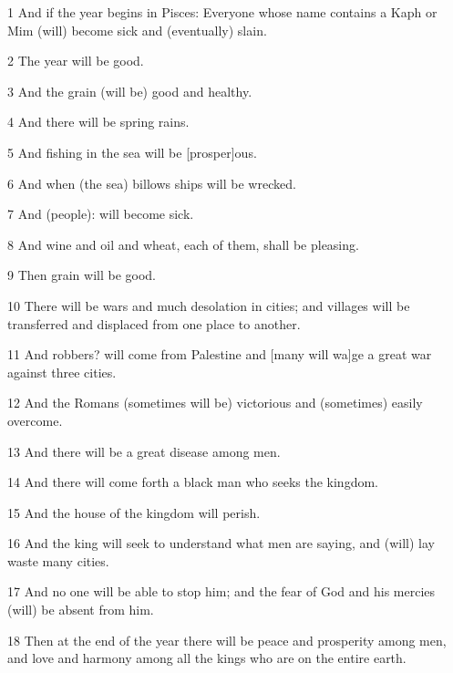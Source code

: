 \par 1 And if the year begins in Pisces: Everyone whose name contains a Kaph or Mim (will) become sick and (eventually) slain. 

\par 2 The year will be good. 

\par 3 And the grain (will be) good and healthy. 

\par 4 And there will be spring rains. 

\par 5 And fishing in the sea will be [prosper]ous.

\par 6 And when (the sea) billows ships will be wrecked. 

\par 7 And (people): will become sick. 

\par 8 And wine and oil and wheat, each of them, shall be pleasing. 

\par 9 Then grain will be good. 

\par 10 There will be wars and much desolation in cities; and villages will be transferred and displaced from one place to another.

\par 11 And robbers? will come from Palestine and [many will wa]ge a great war against three cities. 

\par 12 And the Romans (sometimes will be) victorious and (sometimes) easily overcome. 

\par 13 And there will be a great disease among men. 

\par 14 And there will come forth a black man who seeks the kingdom. 

\par 15 And the house of the kingdom will perish. 

\par 16 And the king will seek to understand what men are saying, and (will) lay waste many cities. 

\par 17 And no one will be able to stop him; and the fear of God and his mercies (will) be absent from him. 

\par 18 Then at the end of the year there will be peace and prosperity among 
men, and love and harmony among all the kings who are on the entire earth.

